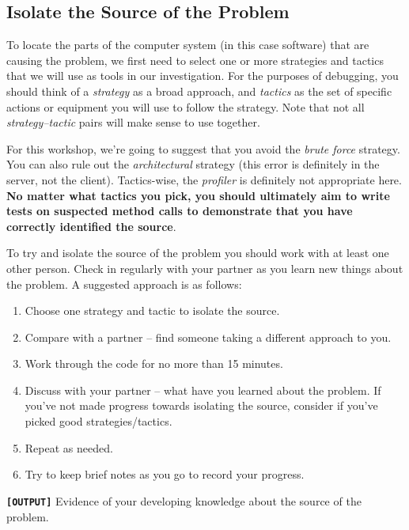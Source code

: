 \documentclass[
]{book}
\providecommand{\tightlist}{%
  \setlength{\itemsep}{0pt}\setlength{\parskip}{0pt}}
\begin{document}
\hypertarget{isolation}{%
\subsection{Isolate the Source of the Problem}\label{isolation}}

To locate the parts of the computer system (in this case software) that are causing the problem, we first need to select one or more strategies and tactics that we will use as tools in our investigation. For the purposes of debugging, you should think of a \emph{strategy} as a broad approach, and \emph{tactics} as the set of specific actions or equipment you will use to follow the strategy. Note that not all \emph{strategy--tactic} pairs will make sense to use together.

For this workshop, we're going to suggest that you avoid the \emph{brute force} strategy. You can also rule out the \emph{architectural} strategy (this error is definitely in the server, not the client). Tactics-wise, the \emph{profiler} is definitely not appropriate here. \textbf{No matter what tactics you pick, you should ultimately aim to write tests on suspected method calls to demonstrate that you have correctly identified the source}.

To try and isolate the source of the problem you should work with at least one other person. Check in regularly with your partner as you learn new things about the problem. A suggested approach is as follows:

\begin{enumerate}
\def\labelenumi{\arabic{enumi}.}
\tightlist
\item
  Choose one strategy and tactic to isolate the source.
\item
  Compare with a partner -- find someone taking a different approach to you.
\item
  Work through the code for no more than 15 minutes.
\item
  Discuss with your partner -- what have you learned about the problem. If you've not made progress towards isolating the source, consider if you've picked good strategies/tactics.
\item
  Repeat as needed.
\item
  Try to keep brief notes as you go to record your progress.
\end{enumerate}

\textbf{\texttt{{[}OUTPUT{]}}} Evidence of your developing knowledge about the source of the problem.
\end{document}
